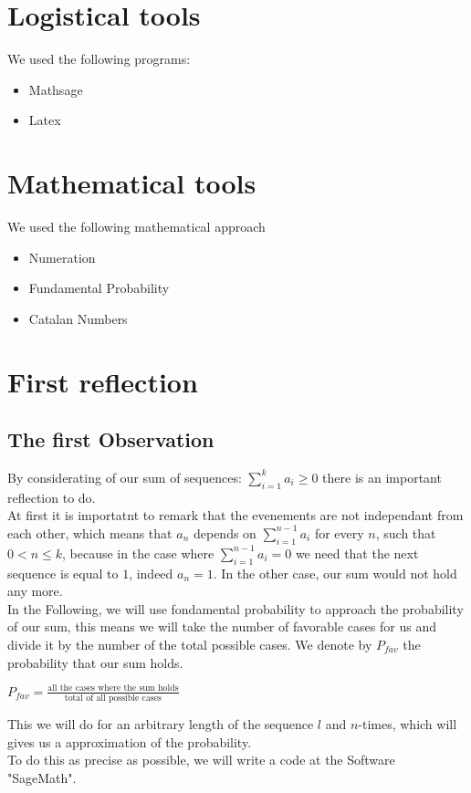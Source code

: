 \documentclass[a4paper,12pt,oneside]{article}
\begin{document}
\section{Logistical tools}
We used the following programs:
\vspace{0,5cm}
\begin{itemize}
  \item Mathsage
	\item Latex
\end{itemize}
\vspace{2cm}
\section{Mathematical tools}
We used the following mathematical approach
\vspace{0,5cm} 
\begin{itemize}  
  \item Numeration
  \item Fundamental Probability 
  \item Catalan Numbers
 \end{itemize}
\newpage
\section{First reflection}
\vspace{0,5cm}
\subsection{The first Observation}
By considerating of  our sum of sequences: $\sum_{i=1}^{k}a_{i}\geq0$ there is an important reflection to do. \vspace{0.3cm}\\At first it is importatnt to remark that the evenements are not independant from each other, which means that $a_{n}$ depends on  $\sum_{i=1}^{n-1}a_{i}$ for every $n$, such that $0<n\leq k$, because in the case where $\sum_{i=1}^{n-1}a_{i}=0$ we need that the next sequence is equal to $1$, indeed $a_{n}=1$. In the other case, our sum would not hold any more. 
\vspace{0.3cm}\\In the Following, we will use fondamental probability to approach the probability of our sum, this means we will take the number of favorable cases for us and divide it by the number of the total possible cases. We denote by $P_{fav}$ the probability that our sum holds. 
\vspace{0.3cm}
\begin{center}
$P_{fav}=\frac{\textrm{all the cases where the sum holds}}{\textrm{total of all possible cases}}$
\end{center}
\vspace{0.3cm}
This we will do for an arbitrary length of the sequence $l$ and $n$-times, which will gives us a approximation of the probability.\\ To  do this as precise as possible, we will write a code at the Software "SageMath". 
\newpage
\end{document}
